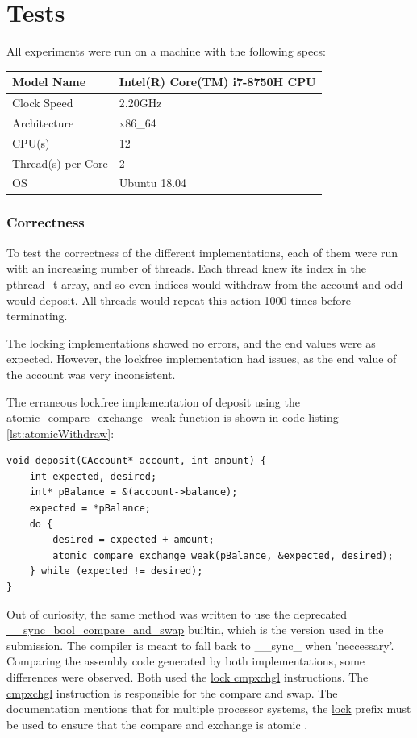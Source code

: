 \documentclass[12pt]{article}
\begin{document}
\part{Tests}

All experiments were run on a machine with the following specs:
\begin{center}
\begin{tabu} to 1.0 \textwidth { | X[l] | X[l] | }
 \hline
 Model Name  & Intel(R) Core(TM) i7-8750H CPU \\ 
 \hline
 Clock Speed & 2.20GHz \\
 \hline
 Architecture  & x86\_64 \\
 \hline
 CPU(s)    & 12 \\
 \hline
 Thread(s) per Core & 2 \\
 \hline
 OS       & Ubuntu 18.04 \\
 \hline
\end{tabu}
\end{center}

\section{Correctness}

To test the correctness of the different implementations, each of them were run with an increasing number of threads. Each thread knew its index in the pthread\_t array, and so even indices would withdraw from the account and odd would deposit. All threads would repeat this action 1000 times before terminating.

The locking implementations showed no errors, and the end values were as expected. However, the lockfree implementation had issues, as the end value of the account was very inconsistent. 

The erraneous lockfree implementation of deposit using the \url{atomic_compare_exchange_weak} function is shown in code listing \ref{lst:atomicWithdraw}:
\begin{lstlisting}[float, floatplacement=H, caption={Withdraw using Atomics}, label={lst:atomicWithdraw}]
void deposit(CAccount* account, int amount) {
    int expected, desired;
    int* pBalance = &(account->balance);
    expected = *pBalance;
    do {
        desired = expected + amount;
        atomic_compare_exchange_weak(pBalance, &expected, desired);
    } while (expected != desired);
}
\end{lstlisting}

Out of curiosity, the same method was written to use the deprecated \url{__sync_bool_compare_and_swap} builtin, which is the version used in the submission. The compiler is meant to fall back to \_\_sync\_ when 'neccessary'. Comparing the assembly code generated by both implementations, some differences were observed. Both used the \url{lock cmpxchgl} instructions. The \url{cmpxchgl} instruction is responsible for the compare and swap. The documentation mentions that for multiple processor systems, the \url{lock} prefix must be used to ensure that the compare and exchange is atomic \cite{intelAtomic}.
\end{document}

